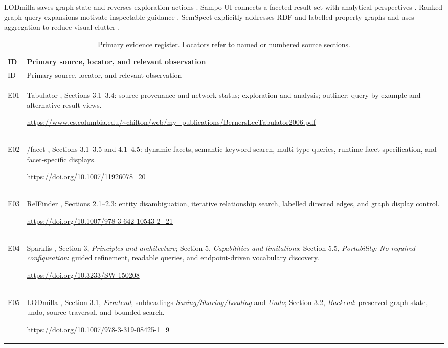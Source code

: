 \documentclass[11pt,a4paper]{article}
\begin{document}
LODmilla saves graph state and reverses exploration actions \citep[Section 3.1]{lodmilla}. Sampo-UI connects a faceted result set with analytical perspectives \citep[Sections 3.1--3.2 and 4.4--4.5]{sampoui}. Ranked graph-query expansions motivate inspectable guidance \citep[Sections 3--4]{suggestions}. SemSpect explicitly addresses RDF and labelled property graphs and uses aggregation to reduce visual clutter \citep[Abstract and Sections 1--2]{semspect}.

{\small
\begin{longtable}{@{}P{1.1cm}P{14.6cm}@{}}
\caption{Primary evidence register. Locators refer to named or numbered source sections.}\label{tab:evidence}\\
\toprule ID & Primary source, locator, and relevant observation\\ \midrule
\endfirsthead\toprule ID & Primary source, locator, and relevant observation\\ \midrule\endhead
\bottomrule\endlastfoot
\hypertarget{evidence:E01}{E01} & Tabulator \citep{tabulator}, Sections 3.1--3.4: source provenance and network status; exploration and analysis; outliner; query-by-example and alternative result views.\par\smallskip\url{https://www.cs.columbia.edu/~chilton/web/my_publications/BernersLeeTabulator2006.pdf}\\
\hypertarget{evidence:E02}{E02} & /facet \citep{facet}, Sections 3.1--3.5 and 4.1--4.5: dynamic facets, semantic keyword search, multi-type queries, runtime facet specification, and facet-specific displays.\par\smallskip\url{https://doi.org/10.1007/11926078_20}\\
\hypertarget{evidence:E03}{E03} & RelFinder \citep{relfinder}, Sections 2.1--2.3: entity disambiguation, iterative relationship search, labelled directed edges, and graph display control.\par\smallskip\url{https://doi.org/10.1007/978-3-642-10543-2_21}\\
\hypertarget{evidence:E04}{E04} & Sparklis \citep{sparklis}, Section 3, \emph{Principles and architecture}; Section 5, \emph{Capabilities and limitations}; Section 5.5, \emph{Portability: No required configuration}: guided refinement, readable queries, and endpoint-driven vocabulary discovery.\par\smallskip\url{https://doi.org/10.3233/SW-150208}\\
\hypertarget{evidence:E05}{E05} & LODmilla \citep{lodmilla}, Section 3.1, \emph{Frontend}, subheadings \emph{Saving/Sharing/Loading} and \emph{Undo}; Section 3.2, \emph{Backend}: preserved graph state, undo, source traversal, and bounded search.\par\smallskip\url{https://doi.org/10.1007/978-3-319-08425-1_9}\\

\end{longtable}}
\end{document}
